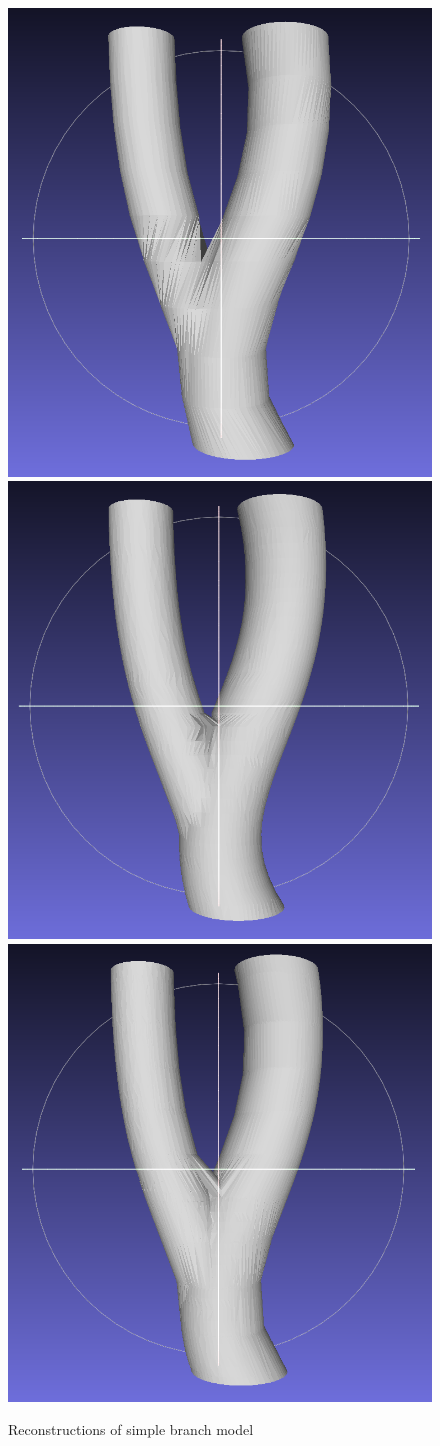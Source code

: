 \documentclass[11p, titlepage]{article}
\newcommand{\reconstructionright}{0.67}
\begin{document}
\begin{figure}[h!]
\begin{minipage}[b]{\reconstructionright\linewidth}
       {\includegraphics[width=.48\linewidth]{reconstructions/dtw-simple-branch-10}}
       \hfill
       {\includegraphics[width=.48\linewidth]{reconstructions/cspa50-simple-branch-30}}%
       \hfill
       {\includegraphics[width=.48\linewidth]{reconstructions/cspa50-simple-branch-10}}
     \end{minipage}%
        \caption{Reconstructions of simple branch model}
        \label{fig:simple_branch_reconstructions}
\end{figure}
\end{document}
